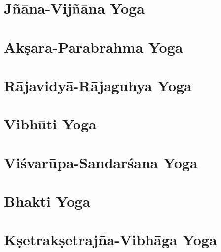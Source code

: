 \documentclass[headings=small]{scrbook}
\begin{document}
\chapter{Jñāna-Vijñāna Yoga}


\chapter{Akṣara-Parabrahma Yoga}


\chapter{Rājavidyā-Rājaguhya Yoga}


\chapter{Vibhūti Yoga}


\chapter{Viśvarūpa-Sandarśana Yoga}


\chapter{Bhakti Yoga}


\chapter{Kṣetrakṣetrajña-Vibhāga Yoga}

\end{document}
